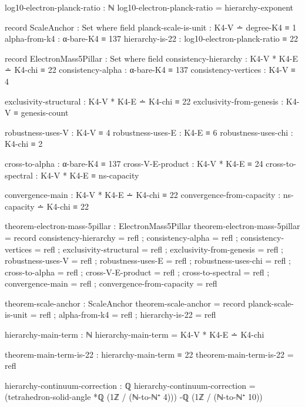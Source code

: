 \documentclass[11pt,a4paper]{book}
\begin{document}
\begin{code}
log10-electron-planck-ratio : ℕ
log10-electron-planck-ratio = hierarchy-exponent

record ScaleAnchor : Set where
  field
    planck-scale-is-unit : K4-V ∸ degree-K4 ≡ 1
    alpha-from-k4 : α-bare-K4 ≡ 137
    hierarchy-is-22 : log10-electron-planck-ratio ≡ 22

record ElectronMass5Pillar : Set where
  field
    consistency-hierarchy : K4-V * K4-E ∸ K4-chi ≡ 22
    consistency-alpha : α-bare-K4 ≡ 137
    consistency-vertices : K4-V ≡ 4
    
    exclusivity-structural : K4-V * K4-E ∸ K4-chi ≡ 22
    exclusivity-from-genesis : K4-V ≡ genesis-count
    
    robustness-uses-V : K4-V ≡ 4
    robustness-uses-E : K4-E ≡ 6
    robustness-uses-chi : K4-chi ≡ 2
    
    cross-to-alpha : α-bare-K4 ≡ 137
    cross-V-E-product : K4-V * K4-E ≡ 24
    cross-to-spectral : K4-V * K4-E ≡ ns-capacity
    
    convergence-main : K4-V * K4-E ∸ K4-chi ≡ 22
    convergence-from-capacity : ns-capacity ∸ K4-chi ≡ 22

theorem-electron-mass-5pillar : ElectronMass5Pillar
theorem-electron-mass-5pillar = record
  { consistency-hierarchy = refl
  ; consistency-alpha = refl
  ; consistency-vertices = refl
  ; exclusivity-structural = refl
  ; exclusivity-from-genesis = refl
  ; robustness-uses-V = refl
  ; robustness-uses-E = refl
  ; robustness-uses-chi = refl
  ; cross-to-alpha = refl
  ; cross-V-E-product = refl
  ; cross-to-spectral = refl
  ; convergence-main = refl
  ; convergence-from-capacity = refl
  }

theorem-scale-anchor : ScaleAnchor
theorem-scale-anchor = record
  { planck-scale-is-unit = refl
  ; alpha-from-k4 = refl
  ; hierarchy-is-22 = refl
  }
\end{code}

\begin{code}
hierarchy-main-term : ℕ
hierarchy-main-term = K4-V * K4-E ∸ K4-chi

theorem-main-term-is-22 : hierarchy-main-term ≡ 22
theorem-main-term-is-22 = refl

hierarchy-continuum-correction : ℚ
hierarchy-continuum-correction = 
  (tetrahedron-solid-angle *ℚ (1ℤ / (ℕ-to-ℕ⁺ 4)))
  -ℚ (1ℤ / (ℕ-to-ℕ⁺ 10))
\end{code}
\end{document}

